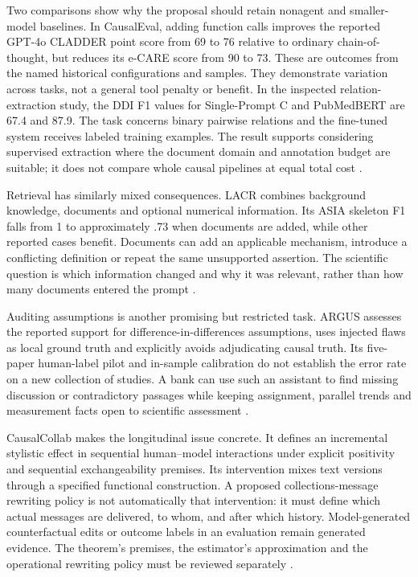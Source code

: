 Two comparisons show why the proposal should retain nonagent and smaller-model
baselines. In CausalEval, adding function calls improves the reported GPT-4o
CLADDER point score from 69 to 76 relative to ordinary chain-of-thought, but
reduces its e-CARE score from 90 to 73. These are outcomes from the named
historical configurations and samples. They demonstrate variation across tasks,
not a general tool penalty or benefit. In the inspected relation-extraction
study, the DDI F1 values for Single-Prompt C and PubMedBERT are 67.4 and 87.9.
The task concerns binary pairwise relations and the fine-tuned system receives
labeled training examples. The result supports considering supervised
extraction where the document domain and annotation budget are suitable; it
does not compare whole causal pipelines at equal total cost
\cite{exec13_census_causaleval,exec13_census_graph_validation}.

Retrieval has similarly mixed consequences. LACR combines background knowledge,
documents and optional numerical information. Its ASIA skeleton F1 falls from 1
to approximately .73 when documents are added, while other reported cases
benefit. Documents can add an applicable mechanism, introduce a conflicting
definition or repeat the same unsupported assertion. The scientific question
is which information changed and why it was relevant, rather than how many
documents entered the prompt \cite{v12_la_2402_15301}.

Auditing assumptions is another promising but restricted task. ARGUS assesses
the reported support for difference-in-differences assumptions, uses injected
flaws as local ground truth and explicitly avoids adjudicating causal truth.
Its five-paper human-label pilot and in-sample calibration do not establish
the error rate on a new collection of studies. A bank can use such an assistant
to find missing discussion or contradictory passages while keeping assignment,
parallel trends and measurement facts open to scientific assessment
\cite{v12_la_2609_30867}.

CausalCollab makes the longitudinal issue concrete. It defines an incremental
stylistic effect in sequential human--model interactions under explicit
positivity and sequential exchangeability premises. Its intervention mixes
text versions through a specified functional construction. A proposed
collections-message rewriting policy is not automatically that intervention:
it must define which actual messages are delivered, to whom, and after which
history. Model-generated counterfactual edits or outcome labels in an
evaluation remain generated evidence. The theorem's premises, the estimator's
approximation and the operational rewriting policy must be reviewed separately
\cite{exec13_census_collaboration}.

